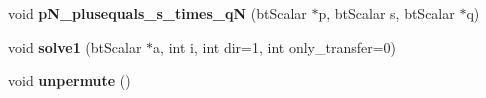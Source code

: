 \begin{DoxyCompactItemize}
\item 
\hypertarget{structbt_l_c_p_a74c5ca0cfd9eb03e64c5b681ed4e31dc}{void {\bfseries p\+N\+\_\+plusequals\+\_\+s\+\_\+times\+\_\+q\+N} (bt\+Scalar $\ast$p, bt\+Scalar s, bt\+Scalar $\ast$q)}\label{structbt_l_c_p_a74c5ca0cfd9eb03e64c5b681ed4e31dc}

\item 
\hypertarget{structbt_l_c_p_a9c5d3a27366a808a038ab40a6c63188c}{void {\bfseries solve1} (bt\+Scalar $\ast$a, int i, int dir=1, int only\+\_\+transfer=0)}\label{structbt_l_c_p_a9c5d3a27366a808a038ab40a6c63188c}

\item 
\hypertarget{structbt_l_c_p_a6787ffab2a737d68ed46588e96b07b9f}{void {\bfseries unpermute} ()}\label{structbt_l_c_p_a6787ffab2a737d68ed46588e96b07b9f}

\end{DoxyCompactItemize}

